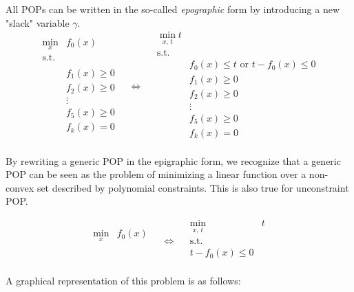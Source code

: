 All POPs can be written in the so-called \textit{epographic} form by introducing a new "slack" variable $\gamma$.
\[
\begin{array}{ll}
    \min\limits_{x} & f_0(x) \\
    \text{s.t.} & \\
      &\\
    & f_1(x) \geq 0 \\
    & f_2(x) \geq 0 \\
    & \vdots \\
    & f_5(x) \geq 0 \\
    & f_k(x) = 0 \\
  
\end{array}
\quad \Longleftrightarrow \quad
\begin{array}{ll}
    \min\limits_{x,\,t}t &  \\
    \text{s.t.} & \\
    & f_0(x) \leq t \text{  or  } t - f_0(x) \leq 0 \\
    & f_1(x) \geq 0 \\
    & f_2(x) \geq 0 \\
    & \vdots \\
    & f_5(x) \geq 0 \\
    & f_k(x) = 0 \\
\end{array}
\]

By rewriting a generic POP in the epigraphic form, we recognize that a generic POP can be seen as the problem of minimizing a linear function over a non-convex set described by polynomial constraints. This is also true for unconstraint POP.

\[
\begin{array}{ll}
    \min\limits_{x} & f_0(x) \\
      &\\
      &\\
\end{array}
\quad \Longleftrightarrow \quad
\begin{array}{ll}
    \min\limits_{x,\,t} & t \\
    \text{s.t.} & \\
     t - f_0(x) \leq 0 \\
  
\end{array}
\]

A graphical representation of this problem is as follows:

